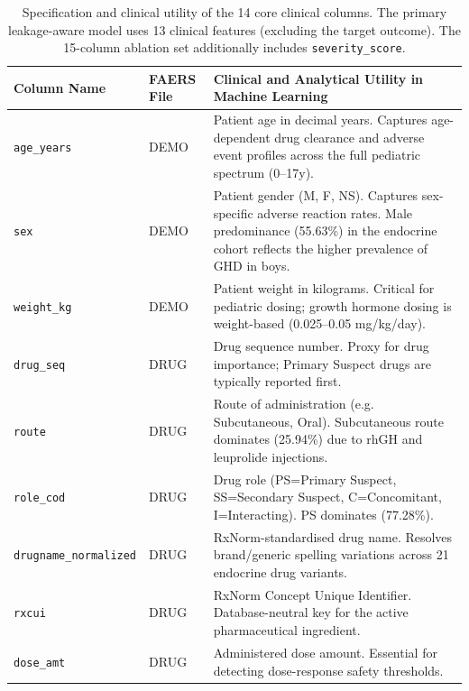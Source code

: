\documentclass[10pt,twocolumn]{article}
\begin{document}
\begin{table}[htbp]
\caption{Specification and clinical utility of the 14 core clinical columns. The primary leakage-aware model uses 13 clinical features (excluding the target outcome). The 15-column ablation set additionally includes \texttt{severity\_score}.}
\label{tab:features_spec}
\centering\small\setlength{\tabcolsep}{8pt}
\begin{tabularx}{\textwidth}{|l|l|p{10.5cm}|}
\hline
\rowcolor{tableHead}
\color{white}\textbf{Column Name} &
\color{white}\textbf{FAERS File} &
\color{white}\textbf{Clinical and Analytical Utility in Machine Learning}\\
\hline
\rowcolor{rowA} \texttt{age\_years} & DEMO & Patient age in decimal years. Captures age-dependent drug clearance and adverse event profiles across the full pediatric spectrum (0--17y). \\
\hline
\rowcolor{rowB} \texttt{sex} & DEMO & Patient gender (M, F, NS). Captures sex-specific adverse reaction rates. Male predominance (55.63\%) in the endocrine cohort reflects the higher prevalence of GHD in boys. \\
\hline
\rowcolor{rowA} \texttt{weight\_kg} & DEMO & Patient weight in kilograms. Critical for pediatric dosing; growth hormone dosing is weight-based (0.025--0.05 mg/kg/day). \\
\hline
\rowcolor{rowB} \texttt{drug\_seq} & DRUG & Drug sequence number. Proxy for drug importance; Primary Suspect drugs are typically reported first. \\
\hline
\rowcolor{rowA} \texttt{route} & DRUG & Route of administration (e.g. Subcutaneous, Oral). Subcutaneous route dominates (25.94\%) due to rhGH and leuprolide injections. \\
\hline
\rowcolor{rowB} \texttt{role\_cod} & DRUG & Drug role (PS=Primary Suspect, SS=Secondary Suspect, C=Concomitant, I=Interacting). PS dominates (77.28\%). \\
\hline
\rowcolor{rowA} \texttt{drugname\_normalized} & DRUG & RxNorm-standardised drug name. Resolves brand/generic spelling variations across 21 endocrine drug variants. \\
\hline
\rowcolor{rowB} \texttt{rxcui} & DRUG & RxNorm Concept Unique Identifier. Database-neutral key for the active pharmaceutical ingredient. \\
\hline
\rowcolor{rowA} \texttt{dose\_amt} & DRUG & Administered dose amount. Essential for detecting dose-response safety thresholds. \\

\end{tabularx}
\end{table}
\end{document}

